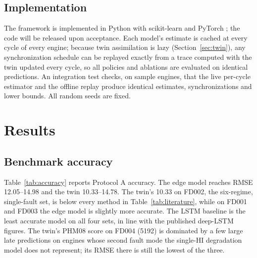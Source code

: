 \documentclass[preprint,12pt,authoryear]{elsarticle}
\begin{document}
\subsection{Implementation}
The framework is implemented in Python with scikit-learn \citep{pedregosa2011sklearn} and PyTorch \citep{paszke2019pytorch}; the code will be released upon acceptance. Each model's estimate is cached at every cycle of every engine; because twin assimilation is lazy (Section~\ref{sec:twin}), any synchronization schedule can be replayed exactly from a trace computed with the twin updated every cycle, so all policies and ablations are evaluated on identical predictions. An integration test checks, on sample engines, that the live per-cycle estimator and the offline replay produce identical estimates, synchronizations and lower bounds. All random seeds are fixed.

\section{Results}\label{sec:results}

\subsection{Benchmark accuracy}
Table~\ref{tab:accuracy} reports Protocol A accuracy. The edge model reaches RMSE 12.05--14.98 and the twin 10.33--14.78. The twin's 10.33 on FD002, the six-regime, single-fault set, is below every method in Table~\ref{tab:literature}, while on FD001 and FD003 the edge model is slightly more accurate. The LSTM baseline is the least accurate model on all four sets, in line with the published deep-LSTM figures. The twin's PHM08 score on FD004 (5192) is dominated by a few large late predictions on engines whose second fault mode the single-HI degradation model does not represent; its RMSE there is still the lowest of the three.
\end{document}
